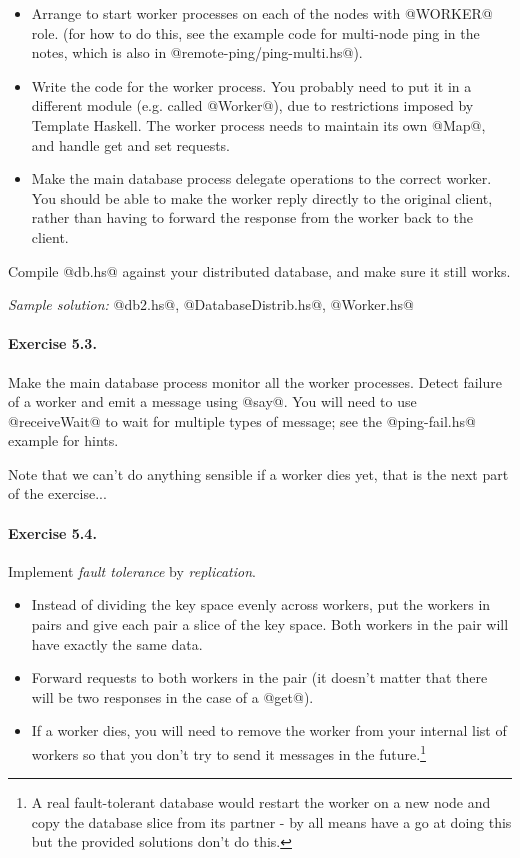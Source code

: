 \documentclass[11pt,a4paper]{article}
\begin{document}
\begin{itemize}
\item Arrange to start worker processes on each of the nodes with
@WORKER@ role.  (for how to do this, see the example code for
multi-node ping in the notes, which is also in @remote-ping/ping-multi.hs@).

\item Write the code for the worker process.  You probably need to put
it in a different module (e.g. called @Worker@), due to restrictions
imposed by Template Haskell.  The worker process needs to maintain its
own @Map@, and handle get and set requests.

\item Make the main database process delegate operations to the
correct worker.  You should be able to make the worker reply directly
to the original client, rather than having to forward the response
from the worker back to the client.
\end{itemize}

Compile @db.hs@ against your distributed database, and make sure it
still works.

\emph{Sample solution:} @db2.hs@, @DatabaseDistrib.hs@, @Worker.hs@

\paragraph{Exercise 5.3.} Make the main database process monitor all the
worker processes.  Detect failure of a worker and emit a message using
@say@.  You will need to use @receiveWait@ to wait for multiple types
of message; see the @ping-fail.hs@ example for hints.

Note that we can't do anything sensible if a worker dies yet, that is
the next part of the exercise...

\paragraph{Exercise 5.4.} Implement \emph{fault tolerance} by
\emph{replication}.

\begin{itemize}
\item Instead of dividing the key space evenly across workers, put the
workers in pairs and give each pair a slice of the key space.  Both
workers in the pair will have exactly the same data.

\item Forward requests to both workers in the pair (it doesn't matter
that there will be two responses in the case of a @get@).

\item If a worker dies, you will need to remove the worker from your
internal list of workers so that you don't try to send it messages in
the future.\footnote{A real fault-tolerant database would restart the worker
on a new node and copy the database slice from its partner - by all
means have a go at doing this but the provided solutions don't do this.}
\end{itemize}
\end{document}
